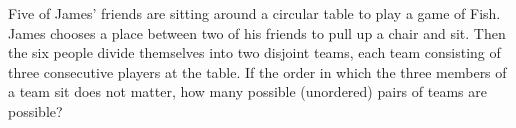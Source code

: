 Five of James' friends are sitting around a circular table to play a game of Fish. James chooses a place between two of his friends to pull up a chair and sit. Then the six people divide themselves into two disjoint teams, each team consisting of three consecutive players at the table. If the order in which the three members of a team sit does not matter, how many possible (unordered) pairs of teams are possible?
